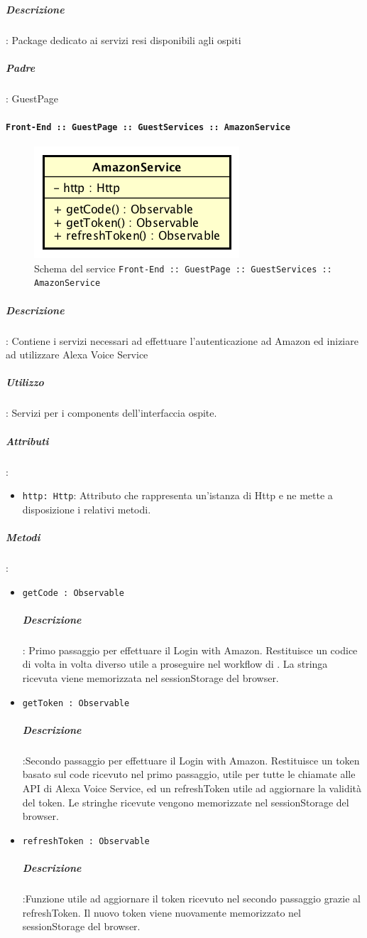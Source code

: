 \documentclass[../DefinizioneDiProdotto_v2.0.0.tex]{subfiles}
\begin{document}
			\subparagraph{Descrizione}: Package dedicato ai servizi resi disponibili agli ospiti
			\subparagraph{Padre}: GuestPage

			\paragraph{\texttt{Front-End :: GuestPage :: GuestServices :: AmazonService}}
			\acapo
			\begin{figure}[!h]
				\centering
				\includegraphics[scale=0.6]{Architettura/Front-End/GuestPage/GuestServices/AmazonService.png}
				\caption{Schema del service \texttt{Front-End :: GuestPage :: GuestServices :: AmazonService}}
			\end{figure}

			\subparagraph{Descrizione}: Contiene i servizi necessari ad effettuare l'autenticazione ad Amazon ed iniziare ad utilizzare Alexa Voice Service
			\subparagraph{Utilizzo}: Servizi per i components dell'interfaccia ospite.
			\subparagraph{Attributi}:
			\begin{itemize}
				\item \texttt{http: Http}: Attributo che rappresenta un'istanza di Http e ne mette a disposizione i relativi metodi.
			\end{itemize}
			\subparagraph{Metodi}:
			\begin{itemize}
				\item \texttt{getCode : Observable}
				\subparagraph{Descrizione}: Primo passaggio per effettuare il Login with Amazon. Restituisce un codice di volta in volta diverso utile a proseguire nel workflow di . La stringa ricevuta viene memorizzata nel sessionStorage del browser.

				\item \texttt{getToken : Observable}
				\subparagraph{Descrizione}:Secondo passaggio per effettuare il Login with Amazon. Restituisce un token basato sul code ricevuto nel primo passaggio, utile per tutte le chiamate alle API di Alexa Voice Service, ed un refreshToken utile ad aggiornare la validità del token. Le stringhe ricevute vengono memorizzate nel sessionStorage del browser.

				\item \texttt{refreshToken : Observable}
				\subparagraph{Descrizione}:Funzione utile ad aggiornare il token ricevuto nel secondo passaggio grazie al refreshToken. Il nuovo token viene nuovamente memorizzato nel sessionStorage del browser.
			\end{itemize}
\end{document}
